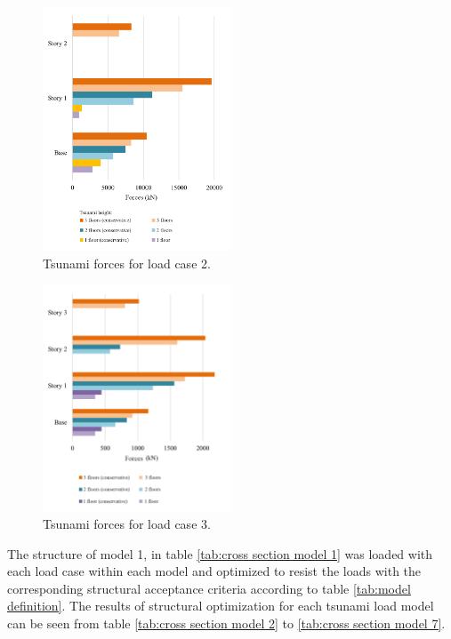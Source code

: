 \documentclass{cup-pan}
\begin{document}
\begin{figure}[H]
\centering
\includegraphics[width=0.5\textwidth]{Picture10_engels.png}
\caption{Tsunami forces for load case 2.}
\label{fig:lc2}
\end{figure}

\begin{figure}[H]
\centering
\includegraphics[width=0.5\textwidth]{Picture11_engels.png}
\caption{Tsunami forces for load case 3.}
\label{fig:lc3}
\end{figure}

The structure of model 1, in table \ref{tab:cross section model 1} was loaded with each load case within each model and optimized to resist the loads with the corresponding structural acceptance criteria according to table \ref{tab:model definition}. The results of structural optimization for each tsunami load model can be seen from table \ref{tab:cross section model 2} to \ref{tab:cross section model 7}.
\end{document}
